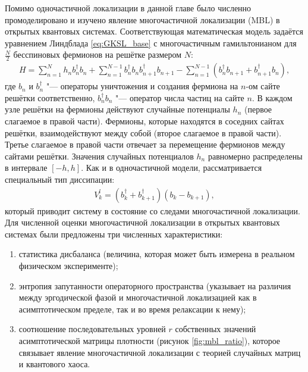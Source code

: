 Помимо одночастичной локализации в данной главе было численно промоделировано и изучено явление многочастичной локализации (MBL) в открытых квантовых системах. Соответствующая математическая модель задаётся уравнением Линдблада \cref{eq:GKSL_base} с многочастичным гамильтонианом для \(\frac{N}{2}\) бесспиновых фермионов на решётке размером \(N\): 
\begin{equation}
\label{eq:mbl_H}
\begin{gathered}
H = \sum_{n=1}^{N} h_n b^{\dagger}_n b_n + \sum_{n=1}^{N-1} b^{\dagger}_n b_n b^{\dagger}_{n+1} b_{n+1} - \sum_{n=1}^{N-1} \left( b^{\dagger}_n b_{n+1} + b^{\dagger}_{n+1} b_n \right) ,
\end{gathered}
\end{equation}
где \(b_n\) и \(b^{\dagger}_n\) "--- операторы уничтожения и создания фермиона на \(n\)-ом сайте решётки соответственно, \(b^{\dagger}_n b_n\) "--- оператор числа частиц на сайте \(n\).
В каждом узле решётки на фермионы действуют случайные потенциалы \(h_n\) (первое слагаемое в правой части). Фермионы, которые находятся в соседних сайтах решётки, взаимодействуют между собой (второе слагаемое в правой части). Третье слагаемое в правой части отвечает за перемещение фермионов между сайтами решётки. Значения случайных потенциалов \(h_n\) равномерно распределены в интервале \(\left[-h, h \right]\).
Как и в одночастичной модели, рассматривается специальный тип диссипации:
\begin{equation}
\label{eq:mbl_diss_diehl}
\begin{gathered}
V^l_k = ( b^\dagger_k + b^\dagger_{k+1}) \left( b_k - b_{k+1} \right),
\end{gathered}
\end{equation}
который приводит систему в состояние со следами многочастичной локализации. 
Для численной оценки многочастичной локализации в открытых квантовых системах были предложены три численных характеристики:
\begin{enumerate}[beginpenalty=10000] %
	\item статистика дисбаланса (величина, которая может быть измерена в реальном физическом эксперименте);
	\item энтропия запутанности операторного пространства (указывает на различия между эргодической фазой и многочастичной локализацией как в асимптотическом пределе, так и во время релаксации к нему);
	\item соотношение последовательных уровней \(r\) собственных значений асимптотической матрицы плотности (рисунок \ref{fig:mbl_ratio}), которое связывает явление многочастичной локализации с теорией случайных матриц и квантового хаоса.
\end{enumerate} 

